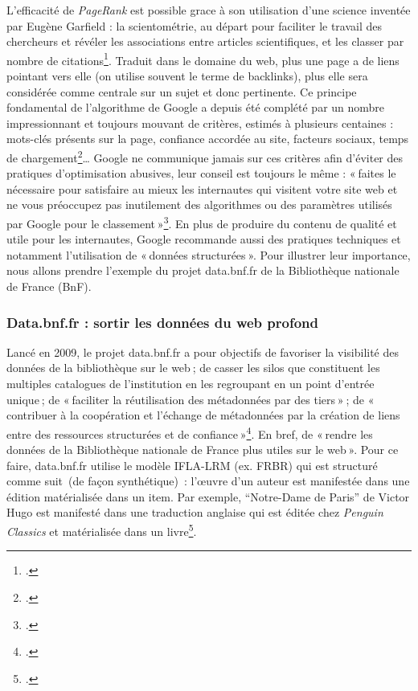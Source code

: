 L'efficacité de \textit{PageRank} est possible grace à son utilisation d’une science inventée par Eugène Garfield : la scientométrie, au départ pour faciliter le travail des chercheurs et révéler les associations entre articles scientifiques, et les classer par nombre de citations\footcite[§ 5]{cardon2013}. Traduit dans le domaine du web, plus une page a de liens pointant vers elle (on utilise souvent le terme de backlinks), plus elle sera considérée comme centrale sur un sujet et donc pertinente. Ce principe fondamental de l’algorithme de Google a depuis été complété par un nombre impressionnant et toujours mouvant de critères, estimés à plusieurs centaines : mots-clés présents sur la page, confiance accordée au site, facteurs sociaux, temps de chargement\footcite{ertzscheid2019}… Google ne communique jamais sur ces critères afin d’éviter des pratiques d’optimisation abusives, leur conseil est toujours le même : « faites le nécessaire pour satisfaire au mieux les internautes qui visitent votre site web et ne vous préoccupez pas inutilement des algorithmes ou des paramètres utilisés par Google pour le classement »\footcite{zotero-236}. En plus de produire du contenu de qualité et utile pour les internautes, Google recommande aussi des pratiques techniques et notamment l’utilisation de « données structurées ». Pour illustrer leur importance, nous allons prendre l’exemple du projet data.bnf.fr de la Bibliothèque nationale de France (BnF).

\subsubsection{Data.bnf.fr : sortir les données du web profond}

Lancé en 2009, le projet data.bnf.fr a pour objectifs de favoriser la visibilité des données de la bibliothèque sur le web ; de casser les silos que constituent les multiples catalogues de l’institution en les regroupant en un point d’entrée unique ; de « faciliter la réutilisation des métadonnées par des tiers » ; de « contribuer à la coopération et l’échange de métadonnées par la création de liens entre des ressources structurées et de confiance »\footcite{s.d.}. En bref, de « rendre les données de la Bibliothèque nationale de France plus utiles sur le web ». Pour ce faire, data.bnf.fr utilise le modèle IFLA-LRM (ex. FRBR) qui est structuré comme suit (de façon synthétique) : l’œuvre d’un auteur est manifestée dans une édition matérialisée dans un item. Par exemple, \enquote{Notre-Dame de Paris} de Victor Hugo est manifesté dans une traduction anglaise qui est éditée chez \textit{Penguin Classics} et matérialisée dans un livre\footcite{bermes2023}.


